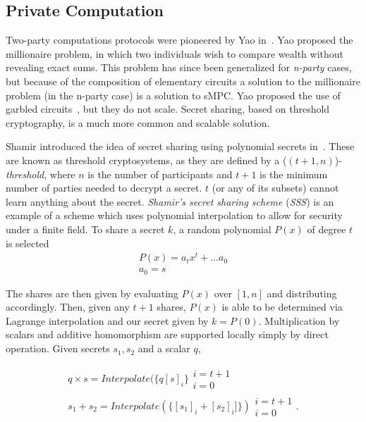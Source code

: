 \documentclass[journal]{IEEEtran}
\begin{document}
\subsection{Private Computation}
\par Two-party computations protocols were pioneered by Yao in~\cite{Yao1982ProtocolsComputations}. Yao proposed the millionaire problem, in which two individuals wish to compare wealth without revealing exact sums. This problem has since been generalized for \textit{n-party} cases, but because of the composition of elementary circuits a solution to the millionaire problem (in the n-party case) is a solution to sMPC. Yao proposed the use of garbled circuits~\cite{Huang2011FasterCircuits.}, but they do not scale. Secret sharing, based on threshold cryptography, is a much more common and scalable solution.

\par Shamir introduced the idea of secret sharing using polynomial secrets in~\cite{Shamir1979HowSecret}. These are known as threshold cryptosystems, as they are defined by a ($(t+1,n)$)-\textit{threshold}, where $n$ is the number of participants and $t+1$ is the minimum number of parties needed to decrypt a secret. $t$ (or any of its subsets) cannot learn anything about the secret. \textit{Shamir's secret sharing scheme} (\textit{SSS}) is an example of a scheme which uses polynomial interpolation to allow for security under a finite field. To share a secret $k$, a random polynomial $P(x)$ of degree $t$ is selected 
\begin{gather}
P(x) = a_{t}x^t + ... a_0 \\
a_0 = s
\end{gather}

\par The shares are then given by evaluating $P(x)$ over $[1,n]$ and distributing accordingly. Then, given any $t+1$ shares, $P(x)$ is able to be determined via Lagrange interpolation and our secret given by $k = P(0)$. Multiplication by scalars and additive homomorphism are supported locally simply by direct operation. Given secrets $s_1,s_2$ and a scalar $q$,

\begin{gather}
q \times s = Interpolate(\{q[s]_i\}\substack{i=t+1\\i=0} \\
s_1 + s_2 = Interpolate(\{[s_1]_i + [s_2]_i]\})\substack{i=t+1\\i=0}.
\end{gather}
\end{document}

